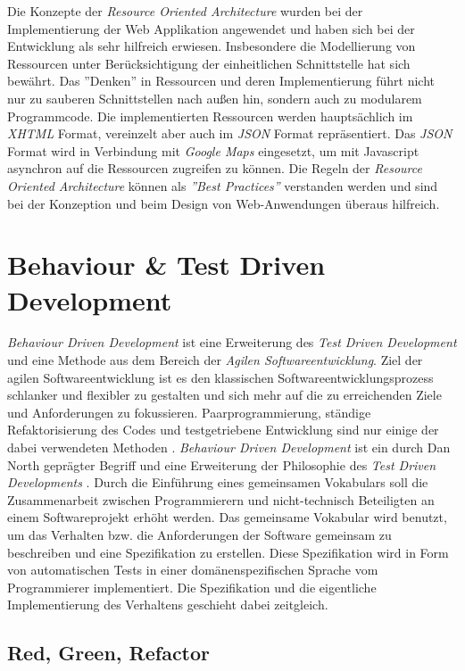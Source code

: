 Die Konzepte der \textit{Resource Oriented Architecture} wurden bei
der Implementierung der Web Applikation angewendet und haben sich bei
der Entwicklung als sehr hilfreich erwiesen. Insbesondere die
Modellierung von Ressourcen unter Berücksichtigung der einheitlichen
Schnittstelle hat sich bewährt. Das ''Denken'' in Ressourcen und deren
Implementierung führt nicht nur zu sauberen Schnittstellen nach außen
hin, sondern auch zu modularem Programmcode. Die implementierten
Ressourcen werden hauptsächlich im \textit{XHTML} Format, vereinzelt
aber auch im \textit{JSON} Format repräsentiert. Das \textit{JSON}
Format wird in Verbindung mit \textit{Google Maps} eingesetzt, um mit
Javascript asynchron auf die Ressourcen zugreifen zu können. Die
Regeln der \textit{Resource Oriented Architecture} können als
\textit{''Best Practices''} verstanden werden und sind bei der
Konzeption und beim Design von Web-Anwendungen überaus hilfreich.

\section{Behaviour \& Test Driven Development}

\textit{Behaviour Driven Development} ist eine Erweiterung des
\textit{Test Driven Development} und eine Methode aus dem Bereich der
\textit{Agilen Softwareentwicklung}. Ziel der agilen
Softwareentwicklung ist es den klassischen Softwareentwicklungsprozess
schlanker und flexibler zu gestalten und sich mehr auf die zu
erreichenden Ziele und Anforderungen zu
fokussieren. Paarprogrammierung, ständige Refaktorisierung des Codes
und testgetriebene Entwicklung sind nur einige der dabei verwendeten
Methoden \cite{wiki:agile}. \textit{Behaviour Driven Development} ist
ein durch Dan North geprägter Begriff und eine Erweiterung der
Philosophie des \textit{Test Driven Developments}
\cite{wiki:bdd}. Durch die Einführung eines gemeinsamen Vokabulars
soll die Zusammenarbeit zwischen Programmierern und nicht-technisch
Beteiligten an einem Softwareprojekt erhöht werden. Das gemeinsame
Vokabular wird benutzt, um das Verhalten bzw. die Anforderungen der
Software gemeinsam zu beschreiben und eine Spezifikation zu erstellen.
Diese Spezifikation wird in Form von automatischen Tests in einer
domänen\-spezifischen Sprache vom Programmierer implementiert. Die
Spezifikation und die eigentliche Implementierung des Verhaltens
geschieht dabei zeitgleich.

\subsection{Red, Green, Refactor}

